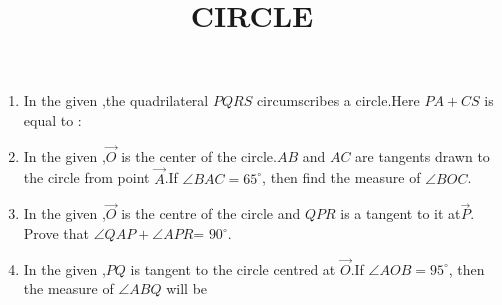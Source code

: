 \documentclass[12pt,A4 paper]{article}
\begin{document}
\title{\textbf{CIRCLE}}
\date{}
\maketitle

\begin{enumerate}
	\item In the given ,the quadrilateral $PQRS$ circumscribes a circle.Here $PA+CS$ is equal to : 

\begin{figure}[H]
	        \centering
		
		\caption{}
		\label{fig:1}
\end{figure}



 \begin{figure}[H]
	        \centering
	        
 \end{figure}




\item In the given ,$\vec{O}$ is the center of the circle.$AB$ and $AC$ are tangents drawn to the circle from point $\vec{ A}$.If $\angle BAC=65^{\circ}$, then find the measure of $\angle BOC$.


	\begin{center}
\begin{figure}[H]
	        \centering
	        
		\caption{}
		\label{fig:2}
        \end{figure}
	\end{center}




\item In the given ,$\vec{ O}$ is the centre of the circle and $QPR$ is a tangent to it at$\vec{ P}$. Prove that $\angle QAP+ \angle APR$= $90^{\circ}$.
\begin{figure}[H]
	        \centering
	        
		\caption{}
		\label{fig:3}

        \end{figure}





\item In the given ,$PQ$ is tangent to the circle centred at $\vec{ O}$.If $\angle AOB= 95^{\circ}$, then the measure of $\angle ABQ$ will be
\begin{figure}[H]
	        \centering
	        
		\caption{}
		\label{fig:4}
        \end{figure}



\end{enumerate}
\end{document}
